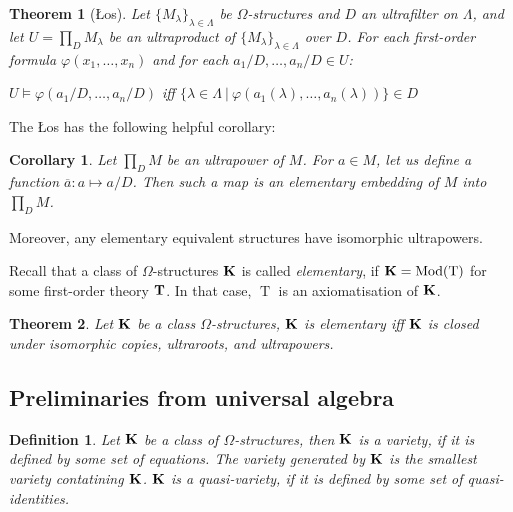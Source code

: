 \documentclass[a4paper]{article}
\theoremstyle{defin}
\newtheorem{defin}{Definition}
\theoremstyle{theorem}
\newtheorem{theorem}{Theorem}
\theoremstyle{prop}
\theoremstyle{lemma}
\theoremstyle{ex}
\theoremstyle{col}
\newtheorem{col}{Corollary}
\begin{document}
\begin{theorem}[\L{}os]

  Let $\{ M_{\lambda}\}_{\lambda \in \Lambda}$ be $\Omega$-structures and $D$ an ultrafilter on $\Lambda$, and let
  $U = \prod \limits_{D} M_{\lambda}$ be an ultraproduct of $\{ M_{\lambda}\}_{\lambda \in \Lambda}$ over $D$. For each first-order formula
  $\varphi(x_1, \dots, x_n)$ and for each $a_1 / D, \dots, a_n / D \in U$:

\begin{center}
  $U \models \varphi(a_1 / D, \dots, a_n / D)$ iff $\{ \lambda \in \Lambda \: | \: \varphi(a_1(\lambda), \dots, a_n(\lambda))\} \in D$
\end{center}
\end{theorem}

The \L{}os has the following helpful corollary:

\begin{col}
  Let $\prod \limits_{D} M$ be an ultrapower of $M$. For $a \in M$, let us define a function $\overline{a} : a \mapsto a / D$.
  Then such a map is an elementary embedding of $M$ into $\prod \limits_{D} M$.
\end{col}

Moreover, any elementary equivalent structures have isomorphic ultrapowers.

Recall that a class of $\Omega$-structures ${\bf K}$ is called \emph{elementary}, if ${\bf K} = \operatorname{Mod}(\operatorname{T})$ for some first-order theory ${\bf T}$. In that case, $\operatorname{T}$ is an axiomatisation of ${\bf K}$.

\begin{theorem}
  Let ${\bf K}$ be a class $\Omega$-structures,
  ${\bf K}$ is elementary iff ${\bf K}$ is closed under isomorphic copies, ultraroots, and ultrapowers.
\end{theorem}

\subsection{Preliminaries from universal algebra}

\begin{defin}
  Let ${\bf K}$ be a class of $\Omega$-structures, then ${\bf K}$ is a variety, if it is defined by some set of equations.
  The variety generated by ${\bf K}$ is the smallest variety contatining ${\bf K}$. ${\bf K}$ is a quasi-variety, if it is defined by some
  set of quasi-identities.
\end{defin}
\end{document}
